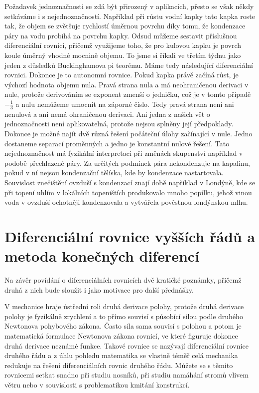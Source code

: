\documentclass[12pt]{article}
\begin{document}
Požadavek jednoznačnosti se zdá být přirozený v aplikacích, přesto se však někdy setkáváme i s nejednoznačností. Například při růstu vodní kapky tato kapka roste tak, že objem se zvětšuje rychlostí úměrnou povrchu díky tomu, že kondenzace páry na vodu probíhá na povrchu kapky. Odsud můžeme sestavit příslušnou diferenciální rovnici, přičemž využijeme toho, že pro kulovou kapku je povrch koule úměrný vhodné mocnině objemu. To jsme si říkali ve třetím týdnu jako jeden z důsledků Buckinghamova pi teorému. Máme tedy následující diferenciální rovnici. Dokonce je to autonomní rovnice. Pokud kapka právě začíná růst, je výchozí hodnota objemu nula. Pravá strana nula a má neohraničenou derivaci v nule, protože derivováním se exponent zmenší o jedničku, což je v tomto případě $-\frac 13$ a nulu nemůžeme umocnit na záporné číslo. Tedy pravá strana není ani nenulová a ani nemá ohraničenou derivaci. Ani jedna z našich vět o jednoznačnosti není aplikovatelná, protože nejsou splněny její předpoklady. Dokonce je možné najít dvě různá řešení počáteční úlohy začínající v nule. Jedno dostaneme separací proměnných a jedno je konstantní nulové řešení. Tato nejednoznačnost má fyzikální interpretaci při změnách skupenství například v podobě přechlazené páry. Za určitých podmínek pára nekondenzuje na kapalinu, pokud v ní nejsou kondenzační tělíska, kde by kondenzace nastartovala. Souvislost znečištění ovzduší s kondenzací znají době například v Londýně, kde se při topení uhlím v lokálních topeništích produkovalo mnoho popílku, jehož vinou voda v ovzduší ochotněji kondenzovala a vytvářela pověstnou londýnskou mlhu.


\section*{Diferenciální rovnice vyšších řádů a metoda konečných diferencí}

Na závěr povídání o diferenciálních rovnicích dvě kratičké poznámky, přičemž druhá z nich bude sloužit i jako motivace pro další přednášky.

V mechanice hraje ústřední roli druhá derivace polohy, protože druhá derivace polohy je fyzikálně zrychlení a to přímo souvisí s působící silou podle druhého Newtonova pohybového zákona. Často síla sama souvisí s polohou a potom je matematická formulace Newtonova zákona rovnicí, ve které figuruje dokonce druhá derivace neznámé funkce. Takové rovnice se nazývají diferenciální rovnice druhého řádu a z úhlu pohledu matematika se vlastně téměř celá mechanika redukuje na řešení diferenciálních rovnic druhého řádu. Můžete se s těmito rovnicemi setkat snadno při studiu nosníků, při studiu namáhání stromů vlivem větru nebo v souvislosti s problematikou kmitání konstrukcí. 
\end{document}
